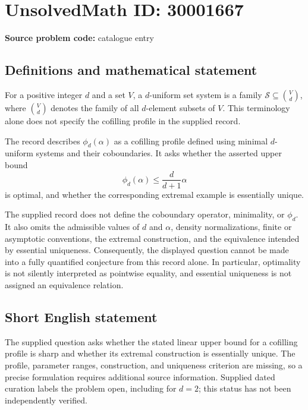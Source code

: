 \documentclass[11pt]{article}
\begin{document}
\section*{UnsolvedMath ID: 30001667}
\textbf{Source problem code:} catalogue entry
\subsection{Definitions and mathematical statement}
For a positive integer \(d\) and a set \(V\), a \(d\)-uniform set system is a family \(\mathcal{S}\subseteq\binom{V}{d}\), where \(\binom{V}{d}\) denotes the family of all \(d\)-element subsets of \(V\). This terminology alone does not specify the cofilling profile in the supplied record.

The record describes \(\phi_d(\alpha)\) as a cofilling profile defined using minimal \(d\)-uniform systems and their coboundaries. It asks whether the asserted upper bound
\[
\phi_d(\alpha)\leq \frac{d}{d+1}\alpha
\]
is optimal, and whether the corresponding extremal example is essentially unique.

The supplied record does not define the coboundary operator, minimality, or \(\phi_d\). It also omits the admissible values of \(d\) and \(\alpha\), density normalizations, finite or asymptotic conventions, the extremal construction, and the equivalence intended by essential uniqueness. Consequently, the displayed question cannot be made into a fully quantified conjecture from this record alone. In particular, optimality is not silently interpreted as pointwise equality, and essential uniqueness is not assigned an equivalence relation.
\subsection{Short English statement}
The supplied question asks whether the stated linear upper bound for a cofilling profile is sharp and whether its extremal construction is essentially unique. The profile, parameter ranges, construction, and uniqueness criterion are missing, so a precise formulation requires additional source information. Supplied dated curation labels the problem open, including for \(d=2\); this status has not been independently verified.
\end{document}
